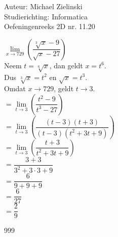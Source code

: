 \documentclass[a4paper]{article}
\begin{document}
  
\noindent \large Auteur: Michael Zielinski \\
\noindent \large Studierichting: Informatica\\
\noindent \large Oefeningenreeks 2D nr. 11.20\\
\medskip
\normalsize

$\lim\limits_{x\rightarrow 729} \left(\dfrac{\sqrt[3]{x}-9}{\sqrt{x}-27}\right)$ \\

Neem $t=\sqrt[6]{x}$, dan geldt $x=t^6$. \\

Dus $\sqrt[3]{x}=t^2$ en $\sqrt{x}=t^3$. \\

Omdat $x\rightarrow 729$, geldt $t\rightarrow 3$. \\

$= \lim\limits_{t\rightarrow 3} \left(\dfrac{t^2-9}{t^3-27}\right)$ \\

$= \lim\limits_{t\rightarrow 3} \left(\dfrac{\left(t-3\right)\left(t+3\right)}{\left(t-3\right)\left(t^2+3t+9\right)}\right)$ \\

$= \lim\limits_{t\rightarrow 3} \left(\dfrac{t+3}{t^2+3t+9}\right)$ \\

$= \dfrac{3+3}{3^2+3\cdot 3+9}$ \\

$= \dfrac{6}{9+9+9}$ \\

$= \dfrac{6}{27}$ \\

$= \dfrac{2}{9}$ \\

\begin{thebibliography}{999}
\end{thebibliography}
\end{document}
